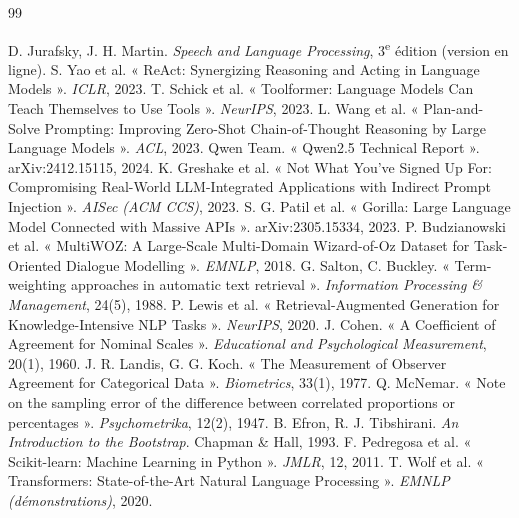 \documentclass[11pt,a4paper]{report}
\begin{document}
\begin{thebibliography}{99}
 D. Jurafsky, J. H. Martin. \emph{Speech and Language Processing}, 3\textsuperscript{e} édition (version en ligne).
 S. Yao et al. « ReAct: Synergizing Reasoning and Acting in Language Models ». \emph{ICLR}, 2023.
 T. Schick et al. « Toolformer: Language Models Can Teach Themselves to Use Tools ». \emph{NeurIPS}, 2023.
 L. Wang et al. « Plan-and-Solve Prompting: Improving Zero-Shot Chain-of-Thought Reasoning by Large Language Models ». \emph{ACL}, 2023.
 Qwen Team. « Qwen2.5 Technical Report ». arXiv:2412.15115, 2024.
 K. Greshake et al. « Not What You've Signed Up For: Compromising Real-World LLM-Integrated Applications with Indirect Prompt Injection ». \emph{AISec (ACM CCS)}, 2023.
 S. G. Patil et al. « Gorilla: Large Language Model Connected with Massive APIs ». arXiv:2305.15334, 2023.
 P. Budzianowski et al. « MultiWOZ: A Large-Scale Multi-Domain Wizard-of-Oz Dataset for Task-Oriented Dialogue Modelling ». \emph{EMNLP}, 2018.
 G. Salton, C. Buckley. « Term-weighting approaches in automatic text retrieval ». \emph{Information Processing \& Management}, 24(5), 1988.
 P. Lewis et al. « Retrieval-Augmented Generation for Knowledge-Intensive NLP Tasks ». \emph{NeurIPS}, 2020.
 J. Cohen. « A Coefficient of Agreement for Nominal Scales ». \emph{Educational and Psychological Measurement}, 20(1), 1960.
 J. R. Landis, G. G. Koch. « The Measurement of Observer Agreement for Categorical Data ». \emph{Biometrics}, 33(1), 1977.
 Q. McNemar. « Note on the sampling error of the difference between correlated proportions or percentages ». \emph{Psychometrika}, 12(2), 1947.
 B. Efron, R. J. Tibshirani. \emph{An Introduction to the Bootstrap}. Chapman \& Hall, 1993.
 F. Pedregosa et al. « Scikit-learn: Machine Learning in Python ». \emph{JMLR}, 12, 2011.
 T. Wolf et al. « Transformers: State-of-the-Art Natural Language Processing ». \emph{EMNLP (démonstrations)}, 2020.
\end{thebibliography}

\appendix
\end{document}
